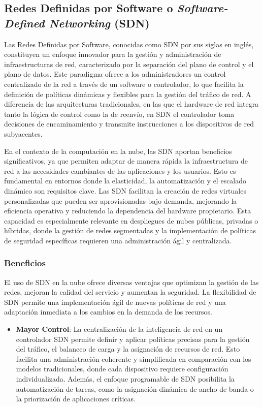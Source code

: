 {        \subsection{Redes Definidas por Software o \textit{Software-Defined Networking} (SDN)}
            Las Redes Definidas por Software, conocidas como SDN por sus siglas en inglés, constituyen un enfoque innovador para la gestión y administración de infraestructuras de red, caracterizado por la separación del plano de control y el plano de datos. Este paradigma ofrece a los administradores un control centralizado de la red a través de un software o controlador, lo que facilita la definición de políticas dinámicas y flexibles para la gestión del tráfico de red. A diferencia de las arquitecturas tradicionales, en las que el hardware de red integra tanto la lógica de control como la de reenvío, en SDN el controlador toma decisiones de encaminamiento y transmite instrucciones a los dispositivos de red subyacentes.
            
            En el contexto de la computación en la nube, las SDN aportan beneficios significativos, ya que permiten adaptar de manera rápida la infraestructura de red a las necesidades cambiantes de las aplicaciones y los usuarios. Esto es fundamental en entornos donde la elasticidad, la automatización y el escalado dinámico son requisitos clave. Las SDN facilitan la creación de redes virtuales personalizadas que pueden ser aprovisionadas bajo demanda, mejorando la eficiencia operativa y reduciendo la dependencia del hardware propietario. Esta capacidad es especialmente relevante en despliegues de nubes públicas, privadas o híbridas, donde la gestión de redes segmentadas y la implementación de políticas de seguridad específicas requieren una administración ágil y centralizada.
            
            \subsubsection{Beneficios}
                El uso de SDN en la nube ofrece diversas ventajas que optimizan la gestión de las redes, mejoran la calidad del servicio y aumentan la seguridad. La flexibilidad de SDN permite una implementación ágil de nuevas políticas de red y una adaptación inmediata a los cambios en la demanda de los recursos.
                
                \begin{itemize}
                    \item \textbf{Mayor Control}: La centralización de la inteligencia de red en un controlador SDN permite definir y aplicar políticas precisas para la gestión del tráfico, el balanceo de carga y la asignación de recursos de red. Esto facilita una administración coherente y simplificada en comparación con los modelos tradicionales, donde cada dispositivo requiere configuración individualizada. Además, el enfoque programable de SDN posibilita la automatización de tareas, como la asignación dinámica de ancho de banda o la priorización de aplicaciones críticas.
                    

\end{itemize}}
